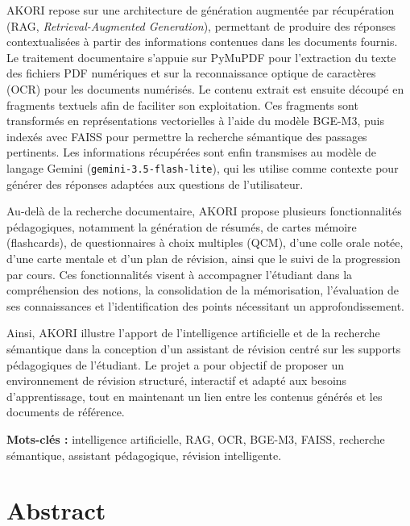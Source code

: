 \documentclass[12pt,a4paper,oneside]{report}
\begin{document}
AKORI repose sur une architecture de génération augmentée par récupération (RAG, \emph{Retrieval-Augmented Generation}), permettant de produire des réponses contextualisées à partir des informations contenues dans les documents fournis. Le traitement documentaire s'appuie sur PyMuPDF pour l'extraction du texte des fichiers PDF numériques et sur la reconnaissance optique de caractères (OCR) pour les documents numérisés. Le contenu extrait est ensuite découpé en fragments textuels afin de faciliter son exploitation. Ces fragments sont transformés en représentations vectorielles à l'aide du modèle BGE-M3, puis indexés avec FAISS pour permettre la recherche sémantique des passages pertinents. Les informations récupérées sont enfin transmises au modèle de langage Gemini (\texttt{gemini-3.5-flash-lite}), qui les utilise comme contexte pour générer des réponses adaptées aux questions de l'utilisateur.

Au-delà de la recherche documentaire, AKORI propose plusieurs fonctionnalités pédagogiques, notamment la génération de résumés, de cartes mémoire (flashcards), de questionnaires à choix multiples (QCM), d'une colle orale notée, d'une carte mentale et d'un plan de révision, ainsi que le suivi de la progression par cours. Ces fonctionnalités visent à accompagner l'étudiant dans la compréhension des notions, la consolidation de la mémorisation, l'évaluation de ses connaissances et l'identification des points nécessitant un approfondissement.

Ainsi, AKORI illustre l'apport de l'intelligence artificielle et de la recherche sémantique dans la conception d'un assistant de révision centré sur les supports pédagogiques de l'étudiant. Le projet a pour objectif de proposer un environnement de révision structuré, interactif et adapté aux besoins d'apprentissage, tout en maintenant un lien entre les contenus générés et les documents de référence.

\vspace{0.5cm}
\noindent\textbf{Mots-clés :} intelligence artificielle, RAG, OCR, BGE-M3, FAISS, recherche sémantique, assistant pédagogique, révision intelligente.

\chapter*{Abstract}
\end{document}
